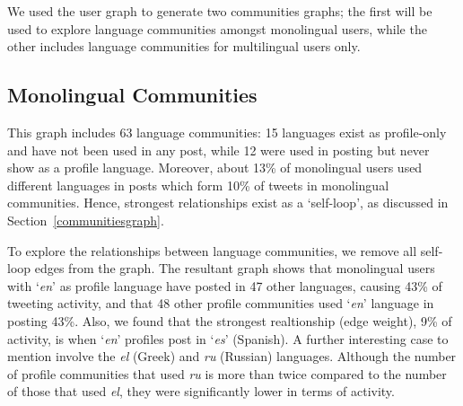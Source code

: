 \documentclass{llncs}
\begin{document}
We used the user graph to generate two communities graphs; the first
will be used to explore language communities amongst monolingual
users, while the other includes language communities for multilingual
users only.


\subsection{Monolingual Communities}

This graph includes 63 language communities: 15 languages exist as
profile-only and have not been used in any post, while 12 were used in
posting but never show as a profile language. Moreover, about 13\% of
monolingual users used different languages in posts which form 10\% of
tweets in monolingual communities. Hence, strongest relationships
exist as a `self-loop', as discussed in
Section~\ref{communitiesgraph}.

To explore the relationships between language communities, we remove
all self-loop edges from the graph. The resultant graph shows that
monolingual users with `{\emph{en}}' as profile language have posted
in 47 other languages, causing 43\% of tweeting activity, and that 48
other profile communities used `{\emph{en}}' language in posting
43\%. Also, we found that the strongest realtionship (edge weight),
9\% of activity, is when `{\emph{en}}' profiles post in `{\emph{es}}'
(Spanish). A further interesting case to mention involve the \emph{el}
(Greek) and \emph{ru} (Russian) languages. Although the number of
profile communities that used \emph{ru} is more than twice compared to
the number of those that used \emph{el}, they were significantly lower
in terms of activity.

\end{document}
